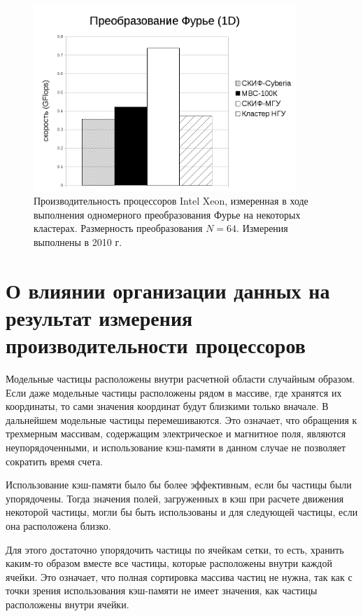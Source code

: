 \begin{figure}[htb]
	\begin{center}
		\includegraphics[height=7cm,keepaspectratio]{images/processor_FLOPS.png}
	\end{center}
	\caption{Производительность процессоров Intel Xeon, измеренная в ходе выполнения одномерного преобразования Фурье на некоторых кластерах. Размерность преобразования $N=64$. Измерения выполнены в 2010 г.}
	\label{procs_flops}
\end{figure} 

\section{О влиянии организации данных на результат измерения производительности процессоров}

Модельные частицы расположены внутри расчетной области случайным образом. Если даже модельные частицы расположены рядом в массиве, где хранятся их координаты,  то сами значения координат будут близкими только вначале. В дальнейшем модельные частицы перемешиваются. Это означает, что обращения к трехмерным массивам, содержащим электрическое и магнитное поля, являются неупорядоченными,  и использование кэш-памяти в данном случае не позволяет сократить время счета. 

Использование кэш-памяти было бы более эффективным, если бы частицы были упорядочены. Тогда значения полей, загруженных в кэш при расчете движения некоторой частицы, могли бы быть использованы и для следующей частицы, если она расположена близко. 

Для этого достаточно упорядочить частицы по ячейкам сетки, то есть, хранить каким-то образом вместе все частицы, которые расположены внутри каждой ячейки. Это означает, что полная сортировка массива частиц не нужна, так как с точки зрения использования кэш-памяти не имеет значения, как частицы расположены внутри ячейки. 

